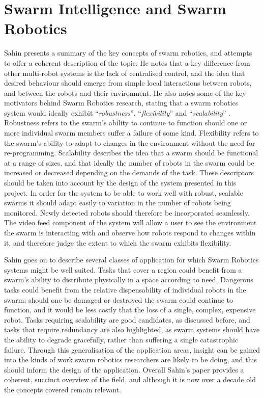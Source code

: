 
\section{Swarm Intelligence and Swarm Robotics} \label{GeneralSwarmRobotics}
Sahin \cite{Sahin:2004} presents a summary of the key concepts of swarm robotics, and attempts to offer a coherent description of the topic. He notes that a key difference from other multi-robot systems is the lack of centralised control, and the idea that desired behaviour should emerge from simple local interactions between robots, and between the robots and their environment. He also notes some of the key motivators behind Swarm Robotics research, stating that a swarm robotics system would ideally exhibit ``\textit{robustness}'', ``\textit{flexibility}'' and ``\textit{scalability}'' \cite{Sahin:2004}. Robustness refers to the swarm's ability to continue to function should one or more individual swarm members suffer a failure of some kind. Flexibility refers to the swarm's ability to adapt to changes in the environment without the need for re-programming. Scalability describes the idea that a swarm should be functional at a range of sizes, and that ideally the number of robots in the swarm could be increased or decreased depending on the demands of the task. These descriptors should be taken into account by the design of the system presented in this project. In order for the system to be able to work well with robust, scalable swarms it should adapt easily to variation in the number of robots being monitored. Newly detected robots should therefore be incorporated seamlessly. The video feed component of the system will allow a user to see the environment the swarm is interacting with and observe how robots respond to changes within it, and therefore judge the extent to which the swarm exhibits flexibility.

Sahin \cite{Sahin:2004} goes on to describe several classes of application for which Swarm Robotics systems might be well suited. Tasks that cover a region could benefit from a swarm's ability to distribute physically in a space according to need. Dangerous tasks could benefit from the relative dispensability of individual robots in the swarm; should one be damaged or destroyed the swarm could continue to function, and it would be less costly that the loss of a single, complex, expensive robot. Tasks requiring scalability are good candidates, as discussed before, and tasks that require redundancy are also highlighted, as swarm systems should have the ability to degrade gracefully, rather than suffering a single catastrophic failure. Through this generalisation of the application areas, insight can be gained into the kinds of work swarm robotics researchers are likely to be doing, and this should inform the design of the application. Overall Sahin's paper \cite{Sahin:2004} provides a coherent, succinct overview of the field, and although it is now over a decade old the concepts covered remain relevant.

